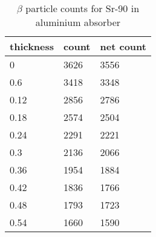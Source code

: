 \begin{table}[!ht]
    \centering
    \begin{tabular}{|l|l|l|}
    \hline
        thickness & count & net count \\ \hline
        0 & 3626 & 3556  \\ \hline
        0.6 & 3418 & 3348  \\ \hline
        0.12 & 2856 & 2786  \\ \hline
        0.18 & 2574 & 2504  \\ \hline
        0.24 & 2291 & 2221  \\ \hline
        0.3 & 2136 & 2066  \\ \hline
        0.36 & 1954 & 1884  \\ \hline
        0.42 & 1836 & 1766  \\ \hline
        0.48 & 1793 & 1723  \\ \hline
        0.54 & 1660 & 1590  \\ \hline
    \end{tabular}

    \caption{$\beta$ particle counts for Sr-90 in aluminium absorber}
\end{table}